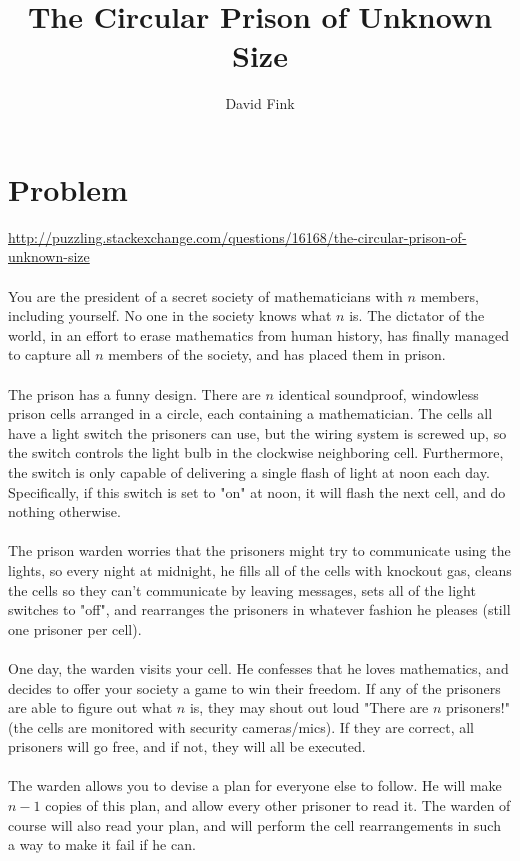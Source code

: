 \documentclass[11pt]{article}
\begin{document}
\title{The Circular Prison of Unknown Size}
\author{David Fink}
\maketitle{}


\section*{Problem}
\url{http://puzzling.stackexchange.com/questions/16168/the-circular-prison-of-unknown-size}\\
\\
You are the president of a secret society of mathematicians with $n$ members, including yourself. No one in the society knows what $n$ is. The dictator of the world, in an effort to erase mathematics from human history, has finally managed to capture all $n$ members of the society, and has placed them in prison.\\
\\
The prison has a funny design. There are $n$ identical soundproof, windowless prison cells arranged in a circle, each containing a mathematician. The cells all have a light switch the prisoners can use, but the wiring system is screwed up, so the switch controls the light bulb in the clockwise neighboring cell. Furthermore, the switch is only capable of delivering a single flash of light at noon each day. Specifically, if this switch is set to "on" at noon, it will flash the next cell, and do nothing otherwise.\\
\\
The prison warden worries that the prisoners might try to communicate using the lights, so every night at midnight, he fills all of the cells with knockout gas, cleans the cells so they can't communicate by leaving messages, sets all of the light switches to "off", and rearranges the prisoners in whatever fashion he pleases (still one prisoner per cell).\\
\\
One day, the warden visits your cell. He confesses that he loves mathematics, and decides to offer your society a game to win their freedom. If any of the prisoners are able to figure out what $n$ is, they may shout out loud "There are $n$ prisoners!" (the cells are monitored with security cameras/mics). If they are correct, all prisoners will go free, and if not, they will all be executed.\\
\\
The warden allows you to devise a plan for everyone else to follow. He will make $n-1$ copies of this plan, and allow every other prisoner to read it. The warden of course will also read your plan, and will perform the cell rearrangements in such a way to make it fail if he can.\\
\end{document}
